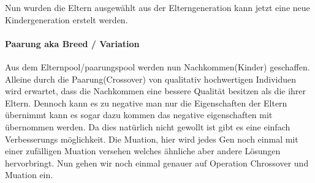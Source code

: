Nun wurden die Eltern ausgewählt aus der Elterngeneration kann jetzt eine neue Kindergeneration erstelt werden. 

\paragraph{Paarung aka Breed / Variation}
Aus dem Elternpool/paarungspool werden nun Nachkommen(Kinder) geschaffen. Alleine durch die Paarung(Crossover) von qualitativ hochwertigen Individuen wird erwartet, dass die Nachkommen eine bessere Qualität besitzen als die ihrer Eltern. Dennoch kann es zu negative man nur die Eigenschaften der Eltern übernimmt kann es sogar dazu kommen das negative eigenschaften mit übernommen werden. Da dies natürlich nicht gewollt ist gibt es eine einfach Verbesserungs möglichkeit. Die Muation, hier wird jedes Gen noch einmal mit einer zufälligen Muation versehen welches ähnliche aber andere Lösungen hervorbringt. Nun gehen wir noch einmal genauer auf Operation Chrossover und Muation ein.

